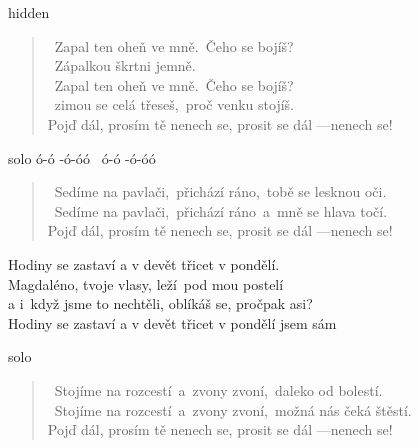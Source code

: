 \begin{song}{}
\begin{optional}{hidden}
   
\end{optional}
\begin{verse}
   ~Zapal ten oheň ve mně.~Čeho se bojíš? \\
   ~Zápalkou škrtni jemně.  \\
   ~Zapal ten oheň ve mně.~Čeho se bojíš? \\
   ~zimou se celá třeseš,~proč venku stojíš. \\
   Pojď dál, prosím tě nenech se, prosit se dál ---nenech se! 
\end{verse}
  \begin{optional}{solo}
   ó-ó -ó-óó~  ó-ó -ó-óó ~
  \end{optional}
\begin{verse}
   ~Sedíme na pavlači,~přichází ráno,~tobě se lesknou oči. \\
   ~Sedíme na pavlači,~přichází ráno~a~mně se hlava točí. \\
   Pojď dál, prosím tě nenech se, prosit se dál ---nenech se!
\end{verse}
\begin{refren}
   Hodiny se zastaví a v devět třicet v pondělí. \\
   Magdaléno, tvoje vlasy, leží~pod mou postelí \\
   a i~když jsme to nechtěli, oblíkáš se, pročpak asi? \\
   Hodiny se zastaví a v devět třicet v pondělí jsem sám ~
\end{refren}
\begin{optional}{solo}
     
\end{optional}
\begin{verse}
   ~Stojíme na rozcestí~a~zvony zvoní,~daleko od bolestí. \\
   ~Stojíme na rozcestí~a~zvony zvoní,~možná nás čeká štěstí. \\
   Pojď dál, prosím tě nenech se, prosit se dál ---nenech se!
\end{verse}


\end{song}
